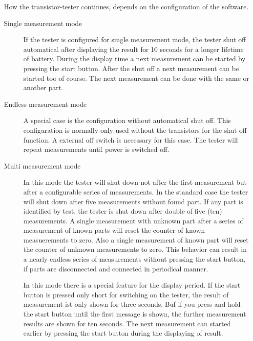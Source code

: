 How the transistor-tester continues, depends on the configuration of the software.
\begin{description}
  \item[Single measurement mode] If the tester is configured for single measurement mode, the tester shut off automatical after displaying the
result for 10 seconds for a longer lifetime of battery. 
During the display time a next measurement can be started by pressing the start button.
After the shut off a next measurement can be started too of course.
The next measurement can be done with the same or another part.\\

  \item[Endless measurement mode] A special case is the configuration without automatical shut off.
This configuration is normally only used without the transistors for the shut off function.
A external off switch is necessary for this case. The tester will repeat measurements until power
is switched off.\\

  \item[Multi measurement mode] In this mode the tester will shut down not after the first measurement but 
after a configurable series of measurements. In the standard case the tester will shut down after five
measurements without found part. If any part is identified by test, the tester is shut down after double of
five (ten) measurements. A single measurement with unknown part after a series of measurement of known parts will
reset the counter of known measuerements to zero. Also a single measurement of known part will reset the counter
of unknown measurements to zero. This behavior can result in a nearly endless series of measurements without
pressing the start button, if parts are disconnected and connected in periodical manner.

In this mode there is a special feature for the display period. If the start button is pressed only short for switching
on the tester, the result of measurement ist only shown for three seconds. Buf if you press and hold the start button until
the first message is shown, the further measurement results are shown for ten seconds.
The next measurement can started earlier by pressing the start button during the displaying of result.\\

\end{description}

